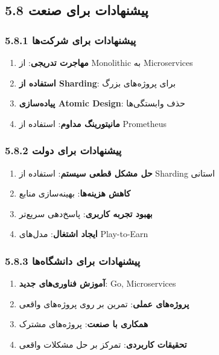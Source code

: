 \documentclass[
]{article}
\providecommand{\tightlist}{%
  \setlength{\itemsep}{0pt}\setlength{\parskip}{0pt}}
\begin{document}
\subsection{5.8 پیشنهادات برای
صنعت}\label{ux67eux6ccux634ux646ux647ux627ux62fux627ux62a-ux628ux631ux627ux6cc-ux635ux646ux639ux62a}

\subsubsection{5.8.1 پیشنهادات برای
شرکت‌ها}\label{ux67eux6ccux634ux646ux647ux627ux62fux627ux62a-ux628ux631ux627ux6cc-ux634ux631ux6a9ux62aux647ux627}

\begin{enumerate}
\def\labelenumi{\arabic{enumi}.}
\tightlist
\item
  \textbf{مهاجرت تدریجی}: از Monolithic به Microservices
\item
  \textbf{استفاده از Sharding}: برای پروژه‌های بزرگ
\item
  \textbf{پیاده‌سازی Atomic Design}: حذف وابستگی‌ها
\item
  \textbf{مانیتورینگ مداوم}: استفاده از Prometheus
\end{enumerate}

\subsubsection{5.8.2 پیشنهادات برای
دولت}\label{ux67eux6ccux634ux646ux647ux627ux62fux627ux62a-ux628ux631ux627ux6cc-ux62fux648ux644ux62a}

\begin{enumerate}
\def\labelenumi{\arabic{enumi}.}
\tightlist
\item
  \textbf{حل مشکل قطعی سیستم}: استفاده از Sharding استانی
\item
  \textbf{کاهش هزینه‌ها}: بهینه‌سازی منابع
\item
  \textbf{بهبود تجربه کاربری}: پاسخ‌دهی سریع‌تر
\item
  \textbf{ایجاد اشتغال}: مدل‌های Play-to-Earn
\end{enumerate}

\subsubsection{5.8.3 پیشنهادات برای
دانشگاه‌ها}\label{ux67eux6ccux634ux646ux647ux627ux62fux627ux62a-ux628ux631ux627ux6cc-ux62fux627ux646ux634ux6afux627ux647ux647ux627}

\begin{enumerate}
\def\labelenumi{\arabic{enumi}.}
\tightlist
\item
  \textbf{آموزش فناوری‌های جدید}: Go, Microservices
\item
  \textbf{پروژه‌های عملی}: تمرین بر روی پروژه‌های واقعی
\item
  \textbf{همکاری با صنعت}: پروژه‌های مشترک
\item
  \textbf{تحقیقات کاربردی}: تمرکز بر حل مشکلات واقعی
\end{enumerate}
\end{document}
